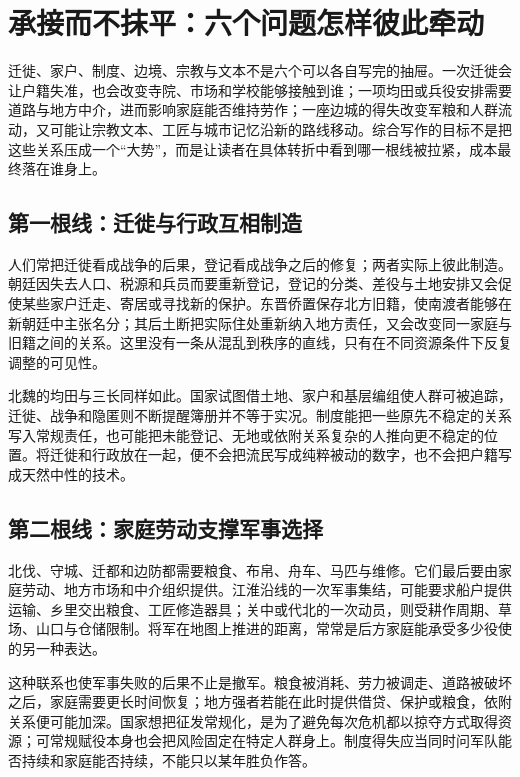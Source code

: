 \section{承接而不抹平：六个问题怎样彼此牵动}
\label{sec:synthesis-connections-costs}

迁徙、家户、制度、边境、宗教与文本不是六个可以各自写完的抽屉。一次迁徙会让户籍失准，也会改变寺院、市场和学校能够接触到谁；一项均田或兵役安排需要道路与地方中介，进而影响家庭能否维持劳作；一座边城的得失改变军粮和人群流动，又可能让宗教文本、工匠与城市记忆沿新的路线移动。综合写作的目标不是把这些关系压成一个“大势”，而是让读者在具体转折中看到哪一根线被拉紧，成本最终落在谁身上。

\subsection{第一根线：迁徙与行政互相制造}

人们常把迁徙看成战争的后果，登记看成战争之后的修复；两者实际上彼此制造。朝廷因失去人口、税源和兵员而要重新登记，登记的分类、差役与土地安排又会促使某些家户迁走、寄居或寻找新的保护。东晋侨置保存北方旧籍，使南渡者能够在新朝廷中主张名分；其后土断把实际住处重新纳入地方责任，又会改变同一家庭与旧籍之间的关系。这里没有一条从混乱到秩序的直线，只有在不同资源条件下反复调整的可见性。

北魏的均田与三长同样如此。国家试图借土地、家户和基层编组使人群可被追踪，迁徙、战争和隐匿则不断提醒簿册并不等于实况。制度能把一些原先不稳定的关系写入常规责任，也可能把未能登记、无地或依附关系复杂的人推向更不稳定的位置。将迁徙和行政放在一起，便不会把流民写成纯粹被动的数字，也不会把户籍写成天然中性的技术。

\subsection{第二根线：家庭劳动支撑军事选择}

北伐、守城、迁都和边防都需要粮食、布帛、舟车、马匹与维修。它们最后要由家庭劳动、地方市场和中介组织提供。江淮沿线的一次军事集结，可能要求船户提供运输、乡里交出粮食、工匠修造器具；关中或代北的一次动员，则受耕作周期、草场、山口与仓储限制。将军在地图上推进的距离，常常是后方家庭能承受多少役使的另一种表达。

这种联系也使军事失败的后果不止是撤军。粮食被消耗、劳力被调走、道路被破坏之后，家庭需要更长时间恢复；地方强者若能在此时提供借贷、保护或粮食，依附关系便可能加深。国家想把征发常规化，是为了避免每次危机都以掠夺方式取得资源；可常规赋役本身也会把风险固定在特定人群身上。制度得失应当同时问军队能否持续和家庭能否持续，不能只以某年胜负作答。

